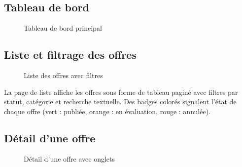 \subsection{Tableau de bord}

\begin{figure}[ht]
\centering
{}
\caption{Tableau de bord principal}
\label{fig:dashboard}
\end{figure}

\subsection{Liste et filtrage des offres}

\begin{figure}[ht]
\centering
{}
\caption{Liste des offres avec filtres}
\label{fig:liste_offres}
\end{figure}

La page de liste affiche les offres sous forme de tableau paginé avec filtres par statut, catégorie et recherche textuelle. Des badges colorés signalent l'état de chaque offre (vert : publiée, orange : en évaluation, rouge : annulée).

\subsection{Détail d'une offre}

\begin{figure}[ht]
\centering
{}
\caption{Détail d'une offre avec onglets}
\label{fig:detail_offre}
\end{figure}

